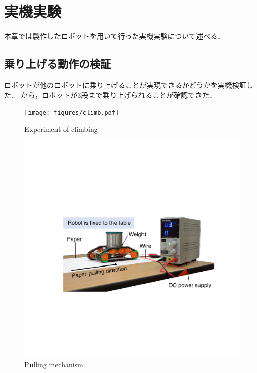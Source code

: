 \section{実機実験}
本章では製作したロボットを用いて行った実機実験について述べる．

\subsection{乗り上げる動作の検証}
ロボットが他のロボットに乗り上げることが実現できるかどうかを実機検証した．
から，ロボットが3段まで乗り上げられることが確認できた．
\begin{figure}[tb]
  \centering
  \texttt{[image: figures/climb.pdf]}
  \caption{Experiment of climbing}
  \label{fig:climb}
\end{figure}

\begin{figure}[tb]
  \centering
  \includegraphics[width=0.85\columnwidth]{figures/pulling-mechanism.pdf}
  \caption{Pulling mechanism}
  \label{fig:pulling-mechanism}
\end{figure}
